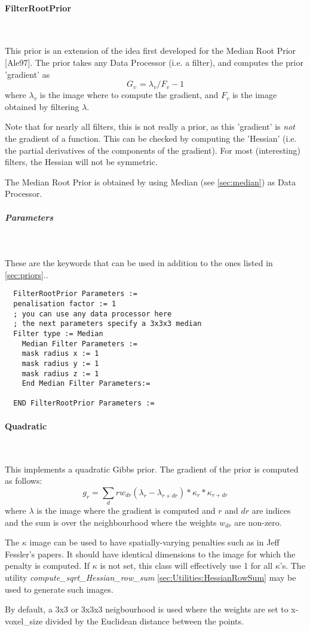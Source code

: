 \documentclass{article}
\newcommand{\subsubsubsection}[1]{\paragraph{#1}\mbox{} \\}
\newcommand{\subsubsubsubsection}[1]{\subparagraph{#1} \mbox{} \\}
\begin{document}
{{{ \subsubsubsection{FilterRootPrior}
}
This prior is an extension of the idea first developed for the 
Median Root Prior [Ale97]. The prior takes any Data Processor 
(i.e. a filter), and computes the prior 'gradient' as 
\[
G_{v\,} =\lambda _{v} /F_{v}  -1
\]
\noindent where 
$\lambda _{v} $
 is the image where to compute the gradient, and 
$F_{v} $ is the image obtained by filtering $\lambda $.

Note that for nearly all filters, this is not really a prior, as 
this 'gradient' is \textit{not} the gradient of a function. This can 
be checked by computing the 'Hessian' (i.e. the partial derivatives 
of the components of the gradient). For most (interesting) filters, 
the Hessian will not be symmetric.


The Median Root Prior is obtained by using Median (see \ref{sec:median}) 
as Data Processor.

{ \subsubsubsubsection{Parameters}
}
These are the keywords that can be used in addition to the ones listed in \ref{sec:priors}..
  \begin{verbatim}
  FilterRootPrior Parameters :=
  penalisation factor := 1
  ; you can use any data processor here
  ; the next parameters specify a 3x3x3 median
  Filter type := Median
    Median Filter Parameters :=
    mask radius x := 1   
    mask radius y := 1
    mask radius z := 1
    End Median Filter Parameters:=

  END FilterRootPrior Parameters :=
 \end{verbatim}


{ \subsubsubsection{Quadratic} \label{sec:priors:Quadratic}
}
This implements a quadratic Gibbs prior. The gradient of the prior is computed as follows:
 \[
  g_r = \sum_dr w_{dr} (\lambda_r - \lambda_{r+dr}) * \kappa_r * \kappa_{r+dr}
  \]
  \noindent where $\lambda$ is the image where the gradient is computed
   and $r$ and $dr$ are indices and the sum
  is over the neighbourhood where the weights $w_{dr}$ are non-zero.

  The $\kappa$ image can be used to have spatially-varying penalties such as in 
  Jeff Fessler's papers. It should have identical dimensions to the image for which the
  penalty is computed. If $\kappa$ is not set, this class will effectively
  use 1 for all $\kappa$'s.
  The utility \textit{compute\_sqrt\_Hessian\_row\_sum} \ref{sec:Utilities:HessianRowSum} may be used to generate such images.

  By default, a 3x3 or 3x3x3 neigbourhood is used where the weights are set to 
  x-voxel\_size divided by the Euclidean distance between the points.
 
}}
\end{document}
